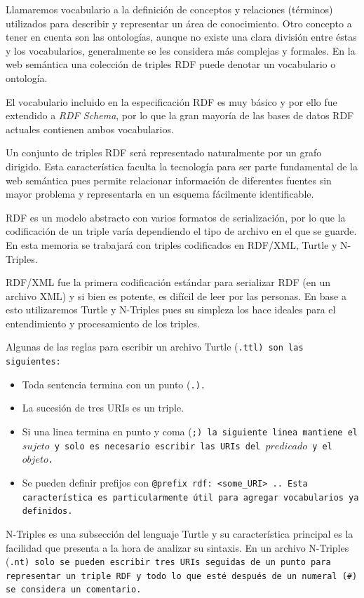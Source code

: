 Llamaremos vocabulario a la definición de conceptos y relaciones (términos)
utilizados para describir y representar un área de conocimiento.
Otro concepto a tener en cuenta son las ontologías, aunque no existe una clara 
división entre éstas y los vocabularios, generalmente se les considera más
complejas y formales.
En la web semántica una colección de triples RDF puede denotar un vocabulario o
ontología.

El vocabulario incluido en la especificación RDF es muy básico y por ello fue
extendido a \emph{RDF Schema}, por lo que la gran mayoría de las bases de datos
RDF actuales contienen ambos vocabularios.

Un conjunto de triples RDF será representado naturalmente por un grafo dirigido.
Esta característica faculta la tecnología para ser parte fundamental de la web 
semántica pues permite relacionar información de diferentes fuentes sin mayor
problema y representarla en un esquema fácilmente identificable.

RDF es un modelo abstracto con varios formatos de serialización, por lo que la
codificación de un triple varía dependiendo el tipo de archivo en el que se
guarde. En esta memoria se trabajará con triples codificados en RDF/XML,
Turtle\cite{beckett2014turtle} y N-Triples\cite{beckett2014nt}.

RDF/XML fue la primera codificación estándar para serializar RDF (en un archivo
XML) y si bien es potente, es difícil de leer por las personas. En base a esto
utilizaremos Turtle y N-Triples pues su simpleza los hace ideales para el
entendimiento y procesamiento de los triples.

Algunas de las reglas para escribir un archivo Turtle (\tt{.ttl}) son las
siguientes:
\begin{itemize}
  \item Toda sentencia termina con un punto (\tt{.}).
  \item La sucesión de tres URIs es un triple.
  \item 
    Si una linea termina en punto y coma (\tt{;}) la siguiente linea mantiene el
    $sujeto$ y solo es necesario escribir las URIs del $predicado$ y el
    $objeto$.
  \item 
    Se pueden definir prefijos con \tt{@prefix rdf: <some\_URI> .}. Esta
    característica es particularmente útil para agregar vocabularios ya
    definidos.
\end{itemize}

N-Triples es una subsección del lenguaje Turtle y su característica principal es
la facilidad que presenta a la hora de analizar su sintaxis. En un archivo
N-Triples (\tt{.nt}) solo se pueden escribir tres URIs seguidas de un punto para
representar un triple RDF y todo lo que esté después de un numeral (\tt{\#}) se
considera un comentario.

